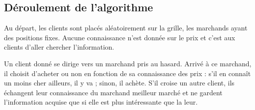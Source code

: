 \subsection{Déroulement de l'algorithme}

Au départ, les clients sont placés aléatoirement sur la grille, les marchands ayant des positions fixes. Aucune connaissance n'est donnée sur le prix et c'est aux clients d'aller chercher l'information.

Un client donné se dirige vers un marchand pris au hasard. Arrivé à ce marchand, il choisit d'acheter ou non en fonction de sa connaissance des prix : s'il en connaît un moins cher ailleurs, il y va ; sinon, il achète.
S'il croise un autre client, ils échangent leur connaissance du marchand meilleur marché et ne gardent l'information acquise que si elle est plus intéressante que la leur.
